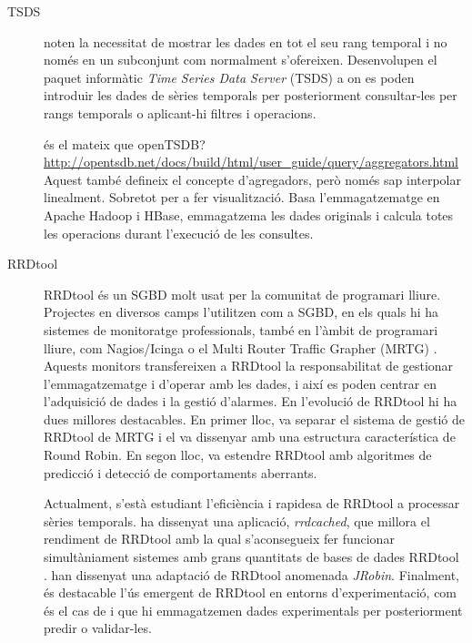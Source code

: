 \begin{description}




\item[TSDS]
\textcite{weigel10} noten la necessitat de mostrar les dades en tot el seu rang temporal i no només en un subconjunt com normalment s'ofereixen. Desenvolupen el paquet informàtic \emph{Time Series Data Server} (TSDS) \parencite{tsds} a on es poden introduir les dades de sèries temporals per posteriorment consultar-les per rangs temporals o aplicant-hi filtres i operacions.


és el mateix que openTSDB? \url{http://opentsdb.net/docs/build/html/user_guide/query/aggregators.html}  Aquest també defineix el concepte d'agregadors, però només sap interpolar linealment. Sobretot per a fer visualització. Basa l'emmagatzematge en Apache Hadoop i HBase, emmagatzema les dades originals i calcula totes les operacions durant l'execució de les consultes.


\item[RRDtool]
RRDtool \parencite{rrdtool} {é}s un SGBD molt usat per la comunitat de programari lliure. Projectes en diversos camps l'utilitzen com a SGBD, en els quals hi ha sistemes de monitoratge professionals, també en l'àmbit de programari lliure, com Nagios/Icinga \parencite{nagios,icinga} o el Multi Router Traffic Grapher (MRTG) \parencite{mrtg}. Aquests monitors transfereixen a RRDtool la responsabilitat de gestionar l'emmagatzematge i d'operar amb les dades, i així es poden centrar en l'adquisició de dades i la gestió d'alarmes. 
En l'evolució de RRDtool hi ha dues millores destacables. En primer lloc, \textcite{lisa98:oetiker} va separar el sistema de gestió de RRDtool de MRTG i el va dissenyar amb una estructura característica de Round Robin. En segon lloc,  \textcite{lisa00:brutlag} va estendre RRDtool amb algoritmes de predicció i detecció de comportaments aberrants. 

Actualment, s'està estudiant l'eficiència i rapidesa de RRDtool a processar sèries temporals. \textcite{carder:rrdcached} ha dissenyat una aplicació, \emph{rrdcached}, que millora el rendiment de RRDtool amb la qual s'aconsegueix fer funcionar  simultàniament sistemes amb grans quantitats de bases de dades RRDtool \parencite{lisa07:plonka}. \textcite{jrobin} han dissenyat una adaptació de RRDtool anomenada \emph{JRobin}. 
Finalment, és destacable l'ús emergent de RRDtool en entorns d'experimentació, com és el cas de \textcite{zhang07} i \textcite{chilingaryan10} que hi emmagatzemen dades experimentals per posteriorment predir o validar-les.



\end{description}
